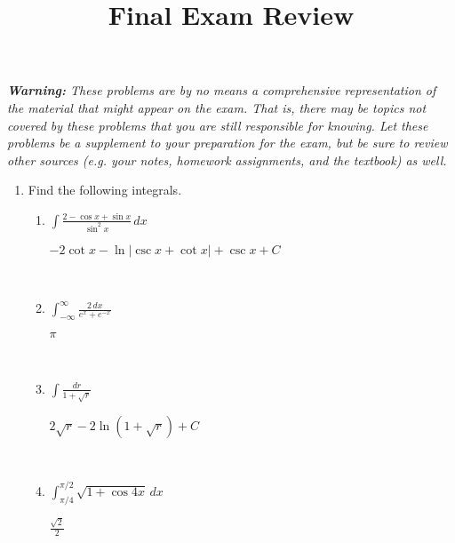 \documentclass[]{handout}
\begin{document}
\title{Final Exam Review}
\maketitle

\noindent\textit{\textbf{Warning:} These problems are by no means a comprehensive
	representation of the material that might appear on the exam.  That is, there may be topics not covered
	by these problems that you are still responsible for knowing.  Let these problems be a supplement to your
	preparation for the exam, but be sure to review other sources (e.g. your notes, homework assignments, and the
	textbook) as well.}


\begin{enumerate}[(1)]

	\item Find the following  integrals.

	\begin{enumerate}

		\item $\displaystyle\int \frac{2- \cos x + \sin x}{\sin^2 x}\, dx$  %

\begin{answer} 
		$\displaystyle -2 \cot x - \ln|\csc x + \cot x| + \csc x + C$
\end{answer}

		\

		\item $\displaystyle\int_{-\infty}^\infty \frac{2\, dx}{e^x + e^{-x}}$  %

\begin{answer} $\pi$
\end{answer}

		\

		\item $\displaystyle\int \frac{dr}{1 + \sqrt r}$  %

\begin{answer} $2 \sqrt r - 2\ln(1+ \sqrt r) + C$
\end{answer}

		\

		\item $\displaystyle\int_{\pi/4}^{\pi/2} \sqrt{1 + \cos 4x} \, dx$  %

\begin{answer} $\displaystyle \frac{\sqrt 2}{2}$
\end{answer}


\end{enumerate}
\end{enumerate}
\end{document}
